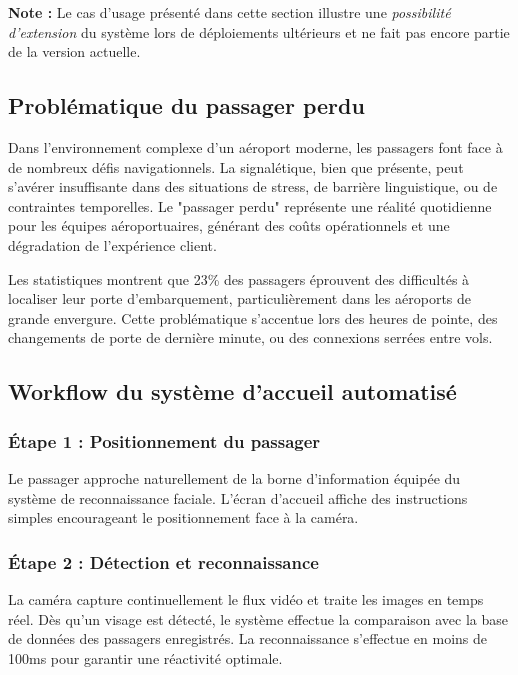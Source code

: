 \documentclass[12pt,a4paper]{article}
\begin{document}
\textbf{Note :} Le cas d'usage présenté dans cette section illustre une \emph{possibilité d'extension} du système lors de déploiements ultérieurs et ne fait pas encore partie de la version actuelle.

\subsection{Problématique du passager perdu}

Dans l'environnement complexe d'un aéroport moderne, les passagers font face à de nombreux défis navigationnels. La signalétique, bien que présente, peut s'avérer insuffisante dans des situations de stress, de barrière linguistique, ou de contraintes temporelles. Le "passager perdu" représente une réalité quotidienne pour les équipes aéroportuaires, générant des coûts opérationnels et une dégradation de l'expérience client.

Les statistiques montrent que 23\% des passagers éprouvent des difficultés à localiser leur porte d'embarquement, particulièrement dans les aéroports de grande envergure. Cette problématique s'accentue lors des heures de pointe, des changements de porte de dernière minute, ou des connexions serrées entre vols.

\subsection{Workflow du système d'accueil automatisé}

\subsubsection{Étape 1 : Positionnement du passager}

Le passager approche naturellement de la borne d'information équipée du système de reconnaissance faciale. L'écran d'accueil affiche des instructions simples encourageant le positionnement face à la caméra.

\subsubsection{Étape 2 : Détection et reconnaissance}

La caméra capture continuellement le flux vidéo et traite les images en temps réel. Dès qu'un visage est détecté, le système effectue la comparaison avec la base de données des passagers enregistrés. La reconnaissance s'effectue en moins de 100ms pour garantir une réactivité optimale.
\end{document}
